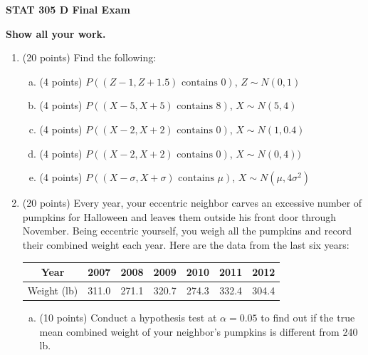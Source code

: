 \documentclass{article}\usepackage{graphicx, color}
\numberwithin{equation}{section}
\begin{document}
\begin{flushleft}


\Huge
\begin{center}
{\bf STAT 305 D Final Exam}
\end{center} 
\huge
\begin{center}
{\bf Show all your work.}
\end{center}

\normalsize
\begin{enumerate}[1. ]

\item (20 points) Find the following:

\begin{enumerate}[a. ]
\item (4 points) $P((Z - 1, Z + 1.5) \text{ contains } 0)$, $Z \sim N(0,1)$
\item (4 points) $P((X - 5, X + 5) \text{ contains } 8)$, $X \sim N(5,4)$
\item (4 points) $P((X - 2, X + 2) \text{ contains } 0)$, $X \sim N(1,0.4)$
\item (4 points) $P((X - 2, X + 2) \text{ contains } 0)$, $X \sim N(0, 4))$
\item (4 points) $P((X - \sigma, X + \sigma) \text{ contains } \mu)$, $X \sim N(\mu, 4 \sigma^2)$
\end{enumerate}


\item (20 points) Every year, your eccentric neighbor carves an excessive number of pumpkins for Halloween and leaves them outside his front door through November. Being eccentric yourself, you weigh all the pumpkins and record their combined weight each year. Here are the data from the last six years: 

\begin{center}
\begin{tabular}{c|cccccc}
Year & 2007 & 2008 & 2009 & 2010 & 2011 & 2012 \\ \hline
Weight (lb) & 311.0 & 271.1 & 320.7 & 274.3 & 332.4 & 304.4   \\ 
\end{tabular}
\end{center}

\begin{enumerate}[a. ]
\item (10 points) Conduct a hypothesis test at $\alpha = 0.05$ to find out if the true mean combined weight of your neighbor's pumpkins is different from 240 lb.






\end{enumerate}
\end{enumerate}
\end{flushleft}
\end{document}
